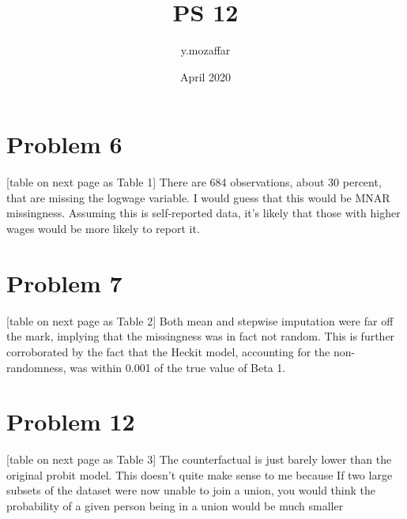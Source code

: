 \documentclass{article} \usepackage[utf8]{inputenc} \title{PS 12}
\author{y.mozaffar } \date{April 2020} \usepackage{natbib}
\begin{document}
 \maketitle \section{Problem 6} 
[table on next page as Table 1] There are 684 observations, about 30 
percent, that are missing the logwage variable. I would guess that this 
would be MNAR missingness. Assuming this is self-reported data, it's 
likely that those with higher wages would be more likely to report it. 
\section{Problem 7} [table on next page as Table 2] Both mean and 
stepwise imputation were far off the mark, implying that the missingness 
was in fact not random. This is further corroborated by the fact that 
the Heckit model, accounting for the non-randomness, was within 0.001 of 
the true value of Beta 1. \section{Problem 12} [table on next page as 
Table 3] The counterfactual is just barely lower than the original 
probit model. This doesn't quite make sense to me because If two large 
subsets of the dataset were now unable to join a union, you would think 
the probability of a given person being in a union would be much smaller 
\end{document}

